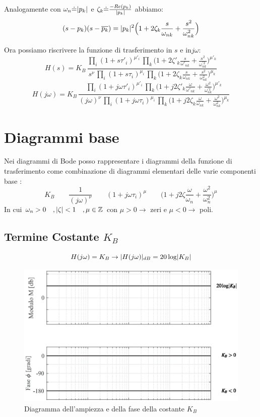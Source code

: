  Analogamente con $ \omega_n \dot{=} \lvert p_k\rvert $ e $ \zeta_k \dot{=} \frac{-Re(p_k)}{\lvert p_k\rvert} $ abbiamo:
   \[ 
  (s-p_k)(s-\overline{p_k}) = \lvert p_k\rvert^2\Big(1+2\zeta_k\frac{s}{\omega_{nk}}+\frac{s^2}{\omega^{2}_{nk}} \Big)
  \]
  
  Ora possiamo riscrivere la funzione di trasferimento in $ s $ e in$ j\omega $:
  \[ 
  	H(s) = K_B \, \frac{\prod_i (1+s\tau'_i)^{\mu'_i}\,  \prod_k \Big(1+2\zeta'_k\frac{s}{\omega'_{nk}}+\frac{s^2}{\omega^{'2}_{nk}} \Big)^{\mu'_k}}{s^\nu\, \prod_i (1+s\tau_i)^{\mu_i}\,  \prod_k \Big(1+2\zeta_k\frac{s}{\omega_{nk}}+\frac{s^2}{\omega^{2}_{nk}} \Big)^{\mu_k} }
   \]
     \[ 
   H(j\omega) = K_B \, \frac{\prod_i (1+j\omega\tau'_i)^{\mu'_i}\,  \prod_k \Big(1+j2\zeta'_k\frac{\omega}{\omega'_{nk}}+\frac{\omega^2}{\omega^{'2}_{nk}} \Big)^{\mu'_k}}{(j\omega)^\nu\, \prod_i (1+j\omega\tau_i)^{\mu_i}\,  \prod_k \Big(1+j2\zeta_k\frac{\omega}{\omega_{nk}}+\frac{\omega^2}{\omega^{2}_{nk}} \Big)^{\mu_k} }
   \]
  
\section{Diagrammi base}
   
   Nei diagrammi di Bode posso rappresentare i diagrammi della funzione di trasferimento come combinazione di diagrammi elementari delle varie componenti base :
\[ %
	K_B \qquad 
	\frac{1}{(j\omega)^\nu} \qquad 
	(1+j\omega\tau_i)^{\mu} \qquad 
	\Big(1+j2\zeta\frac{\omega}{\omega_{n}}+\frac{\omega^2}{\omega^{2}_{n}} \Big)^{\mu}
\]
In cui $ \omega_n > 0 \quad ,\lvert\zeta\rvert<1 \quad,\mu \in \mathbb{Z} $ con $ \mu > 0 \rightarrow$ zeri e $ \mu < 0 \rightarrow$ poli.

\subsection{Termine Costante $ K_B $} 
\[ H(j\omega) = K_B \rightarrow \lvert H(j\omega)\rvert_{dB} = 20 \log \lvert K_B\rvert \]
\begin{figure}[H]
	\centering
	\includegraphics[width=0.8\linewidth]{immagini/cap6_Bode/bodeCost.eps}
	\caption{ Diagramma dell'ampiezza e della fase della costante $  K_B $ }
	\label{fig:bodeCost}
\end{figure}

